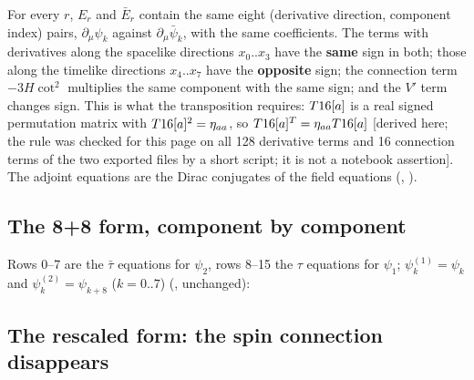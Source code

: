 For every $r$, $E_r$ and $\bar E_r$ contain the same eight (derivative direction, component index)
pairs, $\partial_\mu\psi_k$ against $\partial_\mu\bar\psi_k$, with the same coefficients. The terms
with derivatives along the spacelike directions $x_0..x_3$ have the \textbf{same} sign in both; those
along the timelike directions $x_4..x_7$ have the \textbf{opposite} sign; the connection term
$-3H\cot^2$ multiplies the same component with the same sign; and the $V'$ term changes sign. This is
what the transposition requires: $T16[a]$ is a real signed permutation matrix with
$T16[a]^2=\eta_{aa}$, so $T16[a]^{T}=\eta_{aa}T16[a]$ [derived here; the rule was checked for
this page on all 128 derivative terms and 16 connection terms of the two exported files by a short
script; it is not a notebook assertion]. The adjoint equations are the Dirac conjugates of the field
equations (, ).

\subsection{The 8+8 form, component by component}
\label{sec:5.6}

Rows 0--7 are the $\bar\tau$ equations for $\psi_2$, rows 8--15 the $\tau$ equations for $\psi_1$;
$\psi^{(1)}_k=\psi_k$ and $\psi^{(2)}_k=\psi_{k+8}$ ($k=0..7$)
(, unchanged):

{\small

}

\subsection{The rescaled form: the spin connection disappears}
\label{sec:5.7}

